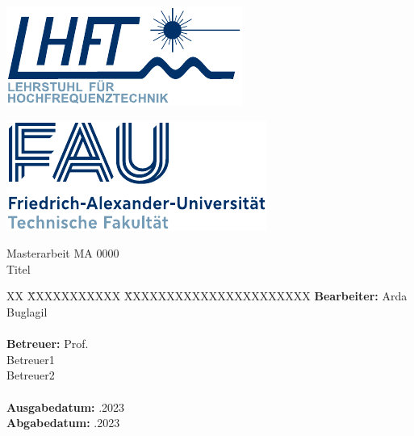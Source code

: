 \thispagestyle{empty}
\setcounter{page}{-1}
\enlargethispage{2cm}	
\begin{minipage}[t]{.5\textwidth}
	\vspace{0pt}
	\raggedright
	\includegraphics*[height = 2.2 cm]{bilder/LHFT_Logo}
\end{minipage}
%
\hfill
%
\begin{minipage}[t]{.5\textwidth}
	\vspace{0pt}
	\raggedleft
	\includegraphics*[height = 2.4 cm]{bilder/FAU_Logo}
\end{minipage}
%
\vfill


{\centering
\large{Masterarbeit MA 0000} \\
\Large{Titel}
\par}


\vfill
\vspace{.5cm}


{\raggedright
\begin{tabbing}
XX \= XXXXXXXXXXX \= XXXXXXXXXXXXXXXXXXXXXX \kill
		\> \textbf{Bearbeiter:} 	\> Arda Buglagil 						\\
 		\>							\>									\\
		\> \textbf{Betreuer:}		\> Prof. 	\\
		\>							\> Betreuer1			\\
		\>							\> Betreuer2			\\
		\>							\> 									\\
		\> \textbf{Ausgabedatum:}	.2023	\\
		\> \textbf{Abgabedatum:}	.2023			
\end{tabbing}
\par}

\newpage
\thispagestyle{empty}

\cleardoublepage
